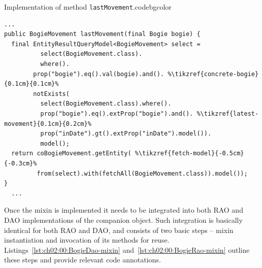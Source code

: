   \begin{code}{Implementation of method \texttt{lastMovement}.}{\label{lst:ch02:00:BogieMixin-impl}}{codebgcolor}
  \begin{lstlisting}
...
public BogieMovement lastMovement(final Bogie bogie) { 
  final EntityResultQueryModel<BogieMovement> select = 
	      select(BogieMovement.class).
	      where().
		prop("bogie").eq().val(bogie).and(). %\tikzref{concrete-bogie}{0.1cm}{0.1cm}%
		notExists(
		  select(BogieMovement.class).where(). 
		  prop("bogie").eq().extProp("bogie").and(). %\tikzref{latest-movement}{0.1cm}{0.2cm}%
		  prop("inDate").gt().extProp("inDate").model()).
	      model();
  return coBogieMovement.getEntity( %\tikzref{fetch-model}{-0.5cm}{-0.3cm}%
         from(select).with(fetchAll(BogieMovement.class)).model());    
}
  ...
  \end{lstlisting}
\end{code}
 
  Once the mixin is implemented it needs to be integrated into both RAO and DAO implementations of the companion object.
  Such integration is basically identical for both RAO and DAO, and consists of two basic steps -- mixin instantiation and invocation of its methods for reuse.
  Listings~\ref{lst:ch02:00:BogieDao-mixin} and~\ref{lst:ch02:00:BogieRao-mixin} outline these steps and provide relevant code annotations.
  
